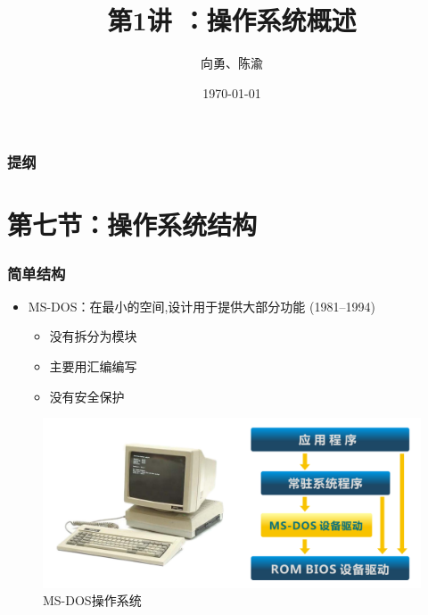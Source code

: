 \documentclass[UTF8]{ctexbeamer}
\title[第1讲]{第1讲 ：操作系统概述} %
\author{向勇、陈渝} %
\institute[清华大学] %
{
清华大学计算机系 \\ %
\medskip
\textit{xyong,yuchen@tsinghua.edu.cn} %
}
\date{\today} %
\begin{document}
\begin{frame}
\titlepage %
\end{frame}

\begin{frame}
\frametitle{提纲} %
\tableofcontents %
\end{frame}


\section{第七节：操作系统结构} %

\begin{frame}

\frametitle{简单结构}

\begin{itemize}
\item MS-DOS：在最小的空间,设计用于提供大部分功能 (1981--1994)
	\begin{itemize}
	\item 没有拆分为模块
	\item 主要用汇编编写
	\item 没有安全保护
	\end{itemize}
\end{itemize}
	\begin{figure}
	\centering
	\includegraphics[width=0.6\linewidth]{msdos}
	\caption{MS-DOS操作系统}
\end{figure}

\end{frame}
\end{document}
